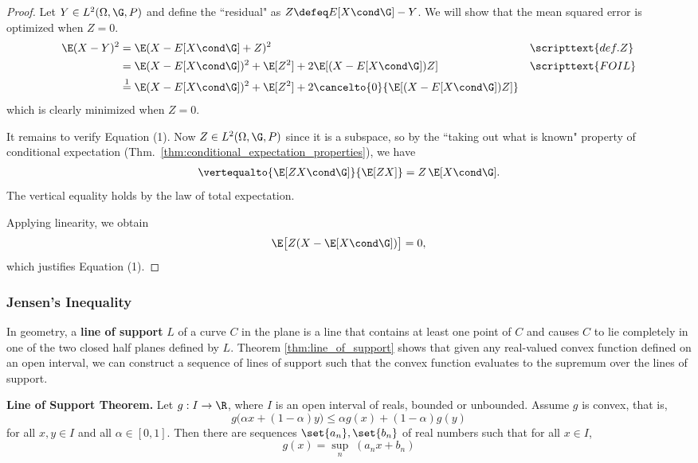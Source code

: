 \documentclass{article} %
\begin{document}
\begin{proof}
Let $Y \in L^2(\Omega, \G, P)$ and define the ``residual" as $Z \defeq E[X \cond \G]-Y$.  We will show that the mean squared error is optimized when $Z=0$.
%
\begin{align*}
\E(X-Y)^2 &= \E(X- E[X \cond \G] + Z)^2 && \scripttext{def. Z} \\
&= \E(X- E[X \cond \G])^2 + \E[Z^2] + 2\E[(X- E[X \cond \G])Z] && \scripttext{FOIL} \\
&\stackrel{1}{=} \E(X- E[X \cond \G])^2 + \E[Z^2] + 2 \cancelto{0}{\E[(X- E[X \cond \G])Z]}
\end{align*}
which is clearly minimized when $Z = 0$.

It remains to verify Equation (1).  Now $Z \in L^2(\Omega, \G, P)$ since it is a subspace, so by the ``taking out what is known" property of conditional expectation (Thm.~\ref{thm:conditional_expectation_properties}), we have
\begin{align*}
\vertequalto{\E[ZX \cond \G]}{\E[ZX]} = Z \, \E[X \cond \G].
\end{align*} 
%
The vertical equality holds by the law of total expectation.

Applying linearity, we obtain
\[ \E\big[Z(X - \E[X \cond \G])\big] = 0, \]
which justifies Equation (1).
\end{proof}

\subsubsection{Jensen's Inequality\footnotemark}


In geometry, a \textbf{line of support} $L$ of a curve $C$ in the plane is a line that contains at least one point of $C$ and causes $C$ to lie completely in one of the two closed half planes defined by $L$.  Theorem \ref{thm:line_of_support} shows that given any real-valued convex function defined on an open interval, we can construct a sequence of lines of support such that the convex function evaluates to the supremum over the lines of support.  

\begin{theorem}
\textbf{Line of Support Theorem.}  Let $g : I \to \R$, where $I$ is an open interval of reals, bounded or unbounded. Assume $g$ is convex, that is,
\[g \big(\alpha x + (1-\alpha) y \big) \leq \alpha g(x) + (1-\alpha) g(y) \]
for all $x,y \in I$ and all $\alpha \in [0,1]$.  Then there are sequences $\set{a_n}, \set{b_n}$ of real numbers such that for all $x \in I$, 
\[ g(x) = \sup_n \; (a_n x + b_n)\]
\label{thm:line_of_support}
\end{theorem}
\end{document}
